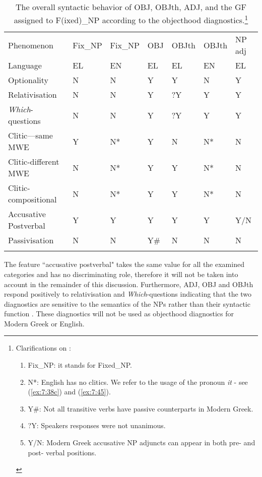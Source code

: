 \documentclass[output=paper]{langsci/langscibook}
\begin{document}
\begin{table}[h!]
\begin{tabular}{lllllll}
\lsptoprule
Phenomenon & Fix\_NP  & Fix\_NP  & OBJ  &  OBJth  &  OBJth  & NP adj \\
Language & EL & EN & EL & EL & EN & EL \\
\midrule
Optionality & N & N & Y & Y & N & Y\\
Relativisation & N & N & Y & ?Y & Y & Y\\
\textit{Which}-questions & N & N & Y & ?Y & Y & Y\\
Clitic—same MWE & Y & N* & Y & N &  N* & N\\
Clitic-different MWE & N & N* & Y & Y & N*  & N\\
Clitic-compositional  & N & N* & Y & Y & N* & N\\
Accusative Postverbal &  Y  & Y &  Y  &  Y  & Y &  Y/N\\
Passivisation & N & N & Y\# & N & N & N\\
\lspbottomrule
\end{tabular}

\caption[The overall syntactic behavior of OBJ, OBJth, ADJ, and the GF assigned to Fixed\_NP according to the objecthood diagnostics]{The overall syntactic behavior of OBJ, OBJth, ADJ, and the GF assigned to F(ixed)\_NP according to the objecthood diagnostics.\footnote{Clarifications on :
\begin{enumerate}
\item Fix\_NP: it stands for Fixed\_NP.
\item N*: English has no clitics. We refer to the usage of the pronoun \textit{it} - see (\ref{ex:7:38c}) and (\ref{ex:7:45}).
\item Y\#: Not all transitive verbs have passive counterparts in Modern Greek.
\item ?Y: Speakers responses were not unanimous.
\item Y/N: Modern Greek accusative NP adjuncts can appear in both pre- and post- verbal positions.
\end{enumerate}}}
\label{tab:1}
\end{table}

The feature ``accusative postverbal" takes the same value for all   the examined categories and has no discriminating role, therefore it will not be taken into account in the remainder of this discussion. Furthermore,  ADJ, OBJ and OBJth respond positively to relativisation and \textit{Which}-questions indicating that the two diagnostics are sensitive to the semantics of the NPs rather than their syntactic function \citep{kaysagidioms}. These diagnostics will not be used as objecthood diagnostics for Modern Greek or English. 
\end{document}
